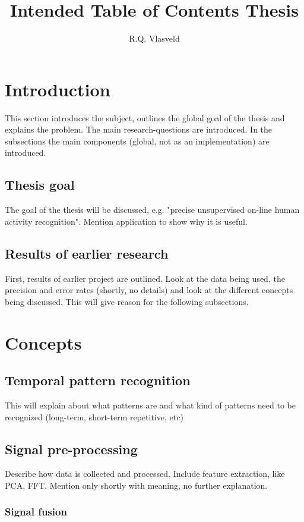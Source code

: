 \documentclass[a4paper,10pt]{extarticle}
\author{R.Q. Vlasveld}
\title{Intended Table of Contents Thesis}
\begin{document}
\maketitle
\tableofcontents

\section{Introduction}
This section introduces the subject, outlines the global goal of the thesis
and explains the problem. The main research-questions are introduced. In the
subsections the main components (global, not as an implementation) are
introduced.

  \subsection{Thesis goal}
  The goal of the thesis will be discussed, e.g. "precise unsupervised on-line human activity recognition". Mention application to show why it is useful.

  \subsection{Results of earlier research}
  First, results of earlier project are outlined. Look at the data being used, the precision and error rates (shortly, no details) and look at the different concepts being discussed. This will give reason for the following subsections.

\section{Concepts}

  \subsection{Temporal pattern recognition}
  This will explain about what patterns are and what kind of patterns need to be recognized (long-term, short-term repetitive, etc)

	\subsection{Signal pre-processing}
  Describe how data is collected and processed. Include feature extraction, like PCA, FFT. Mention only shortly with meaning, no further explanation.

    \subsubsection{Signal fusion}
\end{document}
